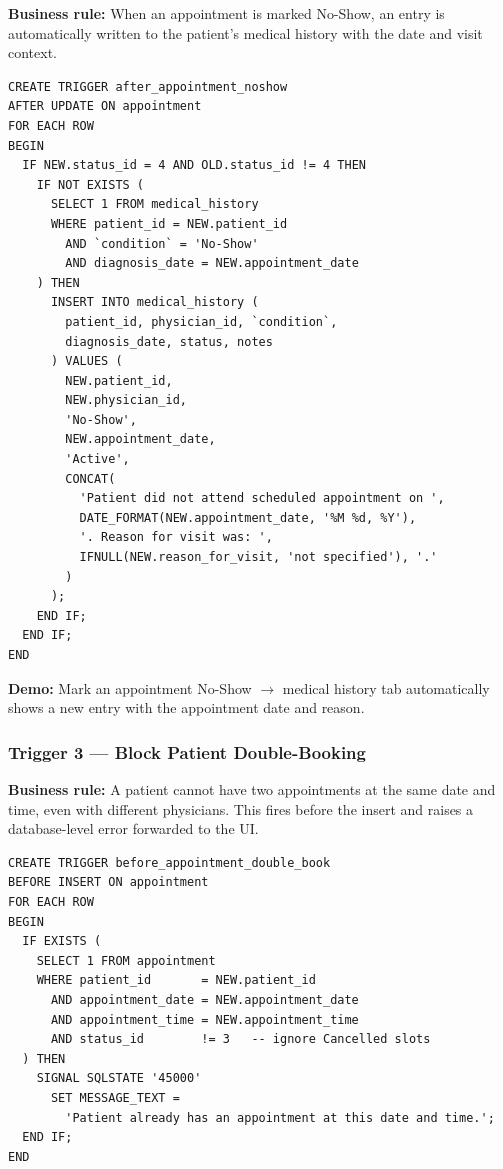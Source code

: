 \documentclass[12pt, letterpaper]{article}
\begin{document}
\textbf{Business rule:} When an appointment is marked No-Show, an entry is automatically written to the patient's medical history with the date and visit context.

\begin{lstlisting}[language=MySQL, caption={Trigger 2: after\_appointment\_noshow}]
CREATE TRIGGER after_appointment_noshow
AFTER UPDATE ON appointment
FOR EACH ROW
BEGIN
  IF NEW.status_id = 4 AND OLD.status_id != 4 THEN
    IF NOT EXISTS (
      SELECT 1 FROM medical_history
      WHERE patient_id = NEW.patient_id
        AND `condition` = 'No-Show'
        AND diagnosis_date = NEW.appointment_date
    ) THEN
      INSERT INTO medical_history (
        patient_id, physician_id, `condition`,
        diagnosis_date, status, notes
      ) VALUES (
        NEW.patient_id,
        NEW.physician_id,
        'No-Show',
        NEW.appointment_date,
        'Active',
        CONCAT(
          'Patient did not attend scheduled appointment on ',
          DATE_FORMAT(NEW.appointment_date, '%M %d, %Y'),
          '. Reason for visit was: ',
          IFNULL(NEW.reason_for_visit, 'not specified'), '.'
        )
      );
    END IF;
  END IF;
END
\end{lstlisting}

\textbf{Demo:} Mark an appointment No-Show $\rightarrow$ medical history tab automatically shows a new entry with the appointment date and reason.

\subsubsection{Trigger 3 — Block Patient Double-Booking}

\textbf{Business rule:} A patient cannot have two appointments at the same date and time, even with different physicians. This fires before the insert and raises a database-level error forwarded to the UI.

\begin{lstlisting}[language=MySQL, caption={Trigger 3: before\_appointment\_double\_book}]
CREATE TRIGGER before_appointment_double_book
BEFORE INSERT ON appointment
FOR EACH ROW
BEGIN
  IF EXISTS (
    SELECT 1 FROM appointment
    WHERE patient_id       = NEW.patient_id
      AND appointment_date = NEW.appointment_date
      AND appointment_time = NEW.appointment_time
      AND status_id        != 3   -- ignore Cancelled slots
  ) THEN
    SIGNAL SQLSTATE '45000'
      SET MESSAGE_TEXT =
        'Patient already has an appointment at this date and time.';
  END IF;
END
\end{lstlisting}
\end{document}

